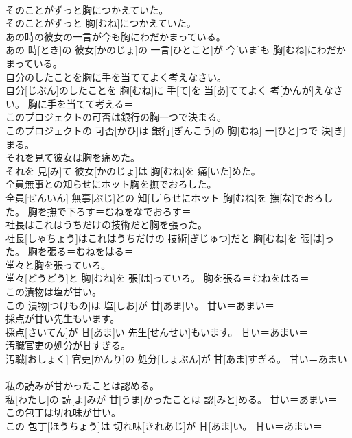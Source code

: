 \documentclass[8pt]{extreport}
\begin{document}
\begin{CJK}{UTF8}{min}
{\\	そのことがずっと胸につかえていた。	
\\	そのことがずっと 胸[むね]につかえていた。	
\\	あの時の彼女の一言が今も胸にわだかまっている。	
\\	あの 時[とき]の 彼女[かのじょ]の 一言[ひとこと]が 今[いま]も 胸[むね]にわだかまっている。	
\\	自分のしたことを胸に手を当ててよく考えなさい。	
\\	自分[じぶん]のしたことを 胸[むね]に 手[て]を 当[あ]ててよく 考[かんが]えなさい。	胸に手を当てて考える＝ 
\\	このプロジェクトの可否は銀行の胸一つで決まる。	
\\	このプロジェクトの 可否[かひ]は 銀行[ぎんこう]の 胸[むね] 一[ひと]つで 決[き]まる。	
\\	それを見て彼女は胸を痛めた。	
\\	それを 見[み]て 彼女[かのじょ]は 胸[むね]を 痛[いた]めた。	
\\	全員無事との知らせにホット胸を撫でおろした。	
\\	全員[ぜんいん] 無事[ぶじ]との 知[し]らせにホット 胸[むね]を 撫[な]でおろした。	胸を撫で下ろす＝むねをなでおろす＝ 
\\	社長はこれはうちだけの技術だと胸を張った。	
\\	社長[しゃちょう]はこれはうちだけの 技術[ぎじゅつ]だと 胸[むね]を 張[は]った。	胸を張る＝むねをはる＝ 
\\	堂々と胸を張っていろ。	
\\	堂々[どうどう]と 胸[むね]を 張[は]っていろ。	胸を張る＝むねをはる＝ 
\\	この漬物は塩が甘い。	
\\	この 漬物[つけもの]は 塩[しお]が 甘[あま]い。	甘い＝あまい＝ 
\\	採点が甘い先生もいます。	
\\	採点[さいてん]が 甘[あま]い 先生[せんせい]もいます。	甘い＝あまい＝ 
\\	汚職官吏の処分が甘すぎる。	
\\	汚職[おしょく] 官吏[かんり]の 処分[しょぶん]が 甘[あま]すぎる。	甘い＝あまい＝ 
\\	私の読みが甘かったことは認める。	
\\	私[わたし]の 読[よ]みが 甘[うま]かったことは 認[みと]める。	甘い＝あまい＝ 
\\	この包丁は切れ味が甘い。	
\\	この 包丁[ほうちょう]は 切れ味[きれあじ]が 甘[あま]い。	甘い＝あまい＝ 
}
\end{CJK}
\end{document}
